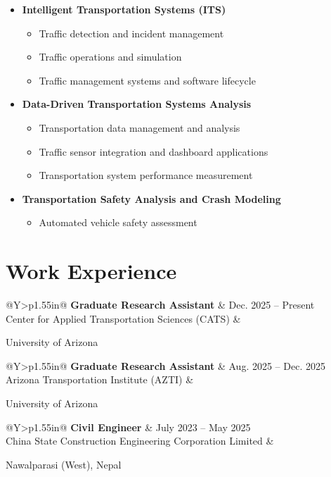 \documentclass[10pt,letterpaper]{article}
\makeatletter
\newcommand{\entryheading}[4]{%
  \begin{tabularx}{\linewidth}{@{}Y>{\raggedleft\arraybackslash}p{1.55in}@{}}
    \textbf{#1} & #2 \\
    #3 & #4
  \end{tabularx}
}
\newenvironment{compactitems}{%
  \begin{itemize}[
    leftmargin=13pt,
    label=\textbullet,
    labelsep=5pt,
    topsep=1pt,
    itemsep=1pt,
    parsep=0pt,
    partopsep=0pt
  ]
}{\end{itemize}}
\newenvironment{researchsubitems}{%
  \begin{itemize}[
    leftmargin=19pt,
    label=\raisebox{0.25ex}{\rule{3pt}{3pt}},
    labelsep=7pt,
    topsep=1pt,
    itemsep=0.5pt,
    parsep=0pt,
    partopsep=0pt
  ]
}{\end{itemize}}
\newcommand{\entryspace}{\vspace{5pt}}
\makeatother
\begin{document}
\begin{compactitems}
  \item \textbf{Intelligent Transportation Systems (ITS)}
    \begin{researchsubitems}
      \item Traffic detection and incident management
      \item Traffic operations and simulation
      \item Traffic management systems and software lifecycle
    \end{researchsubitems}
  \item \textbf{Data-Driven Transportation Systems Analysis}
    \begin{researchsubitems}
      \item Transportation data management and analysis
      \item Traffic sensor integration and dashboard applications
      \item Transportation system performance measurement
    \end{researchsubitems}
  \item \textbf{Transportation Safety Analysis and Crash Modeling}
    \begin{researchsubitems}
      \item Automated vehicle safety assessment
    \end{researchsubitems}
\end{compactitems}

\section{Work Experience}

\entryheading
  {Graduate Research Assistant}
  {Dec. 2025 -- Present}
  {Center for Applied Transportation Sciences (CATS)}
  {}
University of Arizona

\entryspace
\entryheading
  {Graduate Research Assistant}
  {Aug. 2025 -- Dec. 2025}
  {Arizona Transportation Institute (AZTI)}
  {}
University of Arizona

\entryspace
\entryheading
  {Civil Engineer}
  {July 2023 -- May 2025}
  {China State Construction Engineering Corporation Limited}
  {}
Nawalparasi (West), Nepal

\end{document}
